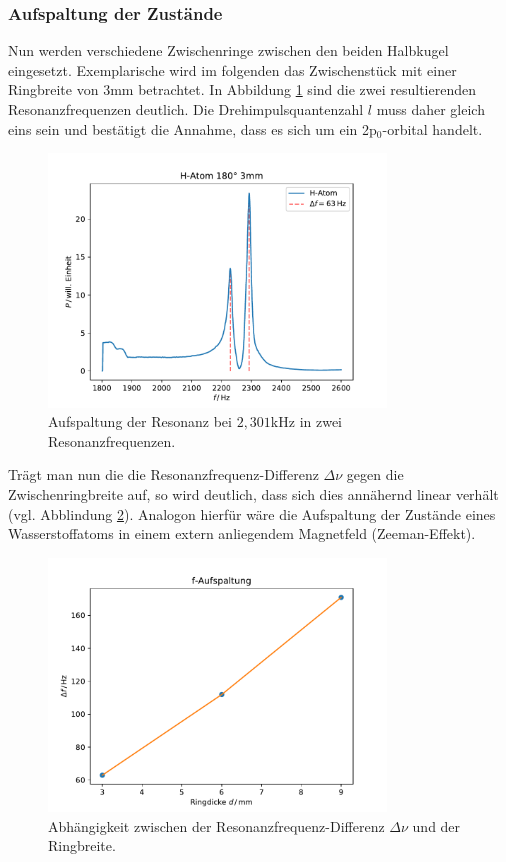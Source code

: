 \subsubsection*{Aufspaltung der Zustände}
Nun werden verschiedene Zwischenringe zwischen den beiden Halbkugel eingesetzt. Exemplarische wird im folgenden das Zwischenstück
mit einer Ringbreite von $3$mm betrachtet. In Abbildung \ref{fig:aufspaltung} sind die zwei resultierenden Resonanzfrequenzen
deutlich. Die Drehimpulsquantenzahl $l$ muss daher gleich eins sein und bestätigt die Annahme, dass es sich um ein 2p$_0$-orbital handelt.  

\begin{figure}[H]
    \center
    \includegraphics[width=0.8\textwidth]{plots/Hatom/zustandsaufspaltung.pdf}
    \caption{Aufspaltung der Resonanz bei $2,301$kHz in zwei Resonanzfrequenzen.}
    \label{fig:aufspaltung}
\end{figure}

Trägt man nun die die Resonanzfrequenz-Differenz $\Delta\nu$ gegen die Zwischenringbreite auf,
so wird deutlich, dass sich dies annähernd linear verhält (vgl. Abblindung \ref{fig:d_res}). Analogon hierfür wäre die Aufspaltung der Zustände eines
Wasserstoffatoms in einem extern anliegendem Magnetfeld (Zeeman-Effekt).

\begin{figure}[H]
    \center
    \includegraphics[width=0.8\textwidth]{plots/Hatom/faufspaltung.pdf}
    \caption{Abhängigkeit zwischen der Resonanzfrequenz-Differenz $\Delta\nu$ und der Ringbreite.}
    \label{fig:d_res}
\end{figure}
\newpage
